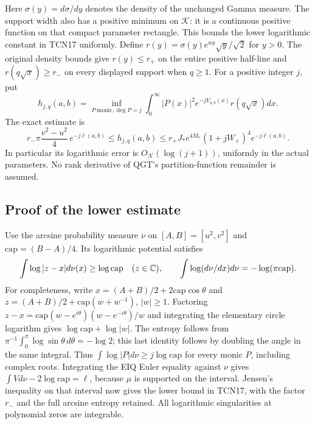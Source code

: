 \documentclass[11pt,a4paper]{article}
\begin{document}
Here $\sigma(y)=d\sigma/dy$ denotes the density of the unchanged
Gamma measure. The support width also has a positive minimum on $\mathscr K$:
it is a continuous positive function on that compact parameter rectangle.
This bounds the lower logarithmic constant in TCN17 uniformly.
Define $r(y)=\sigma(y)e^{\alpha y}\sqrt y/\sqrt2$ for $y>0$.
The original density bounds give $r(y)\le r_+$ on the entire
positive half-line and $r(q\sqrt x)\ge r_-$ on every displayed
support when $q\ge1$.
For a positive integer $j$, put
\[
 h_{j,q}(a,b)=\inf_{P\ \mathrm{monic},\deg P=j}
    \int_0^\infty |P(x)|^2 e^{-jV_{a,b}(x)}r(q\sqrt x)dx.
\]
The exact estimate is
\begin{equation}\tag{TCN17}\label{tcn:monic}
 \boxed{r_-\pi\frac{v^2-u^2}{4}\,e^{-j\ell(a,b)}
 \le h_{j,q}(a,b)
 \le r_+J_*e^{4M_*}(1+jW_+)^4e^{-j\ell(a,b)}.}
\end{equation}
In particular its logarithmic error is $O_{\mathscr K}(\log(j+1))$,
uniformly in the actual parameters. No rank derivative of QGT's
partition-function remainder is assumed.

\subsection{Proof of the lower estimate}
Use the arcsine probability measure $\nu$ on $[A,B]=[u^2,v^2]$ and
$\mathrm{cap}=(B-A)/4$. Its logarithmic potential satisfies
\[
 \int\log|z-x|d\nu(x)\ge\log\mathrm{cap}\quad(z\in\mathbb C),
 \qquad \int\log(d\nu/dx)d\nu=-\log(\pi\mathrm{cap}).
\]
For completeness, write $x=(A+B)/2+2\mathrm{cap}\cos\theta$ and
$z=(A+B)/2+\mathrm{cap}(w+w^{-1})$, $|w|\ge1$.
Factoring $z-x=\mathrm{cap}(w-e^{i\theta})(w-e^{-i\theta})/w$
and integrating the elementary circle logarithm gives
$\log\mathrm{cap}+\log|w|$. The entropy follows from
$\pi^{-1}\int_0^\pi\log\sin\theta\,d\theta=-\log2$;
this last identity follows by doubling the angle in the same integral.
Thus $\int\log|P|d\nu\ge j\log\mathrm{cap}$ for every monic $P$,
including complex roots. Integrating the EIQ Euler equality against
$\nu$ gives $\int Vd\nu-2\log\mathrm{cap}=\ell$, because $\mu$
is supported on the interval. Jensen's inequality on that interval now
gives the lower bound in TCN17, with the factor $r_-$ and the full
arcsine entropy retained. All logarithmic singularities at polynomial
zeros are integrable.
\end{document}

